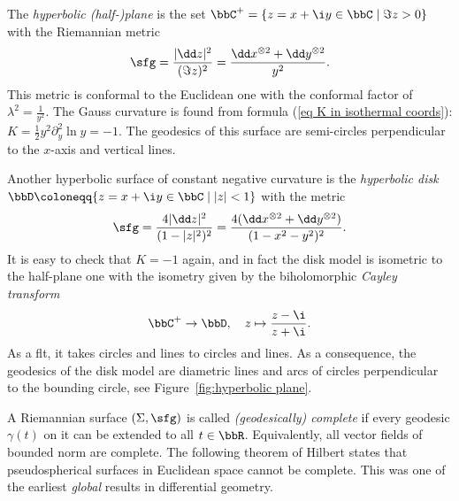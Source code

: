 \begin{example}
    The \emph{hyperbolic (half-)plane} is the set $\bbC^+=\{z=x+\i y\in\bbC\mid \Im z>0\}$ with the Riemannian metric 
    \[\sfg=\frac{|\dd z|^2}{(\Im z)^2}=\frac{\dd x^{\otimes 2}+\dd y^{\otimes 2}}{y^2}.\]
    This metric is conformal to the Euclidean one with the conformal factor of $\lambda^2=\frac{1}{y^2}$. The Gauss curvature is found from formula (\ref{eq K in isothermal coords}): $K=\frac12y^2\partial_y^2\ln y=-1$. The geodesics of this surface are semi-circles perpendicular to the $x$-axis and vertical lines.
    
    Another hyperbolic surface of constant negative curvature is the \emph{hyperbolic disk}  $\bbD\coloneqq \{z=x+\i y\in\bbC \mid |z|<1\}$ with the metric 
    \[\sfg=\frac{4|\dd z|^2}{(1-|z|^2)^2}=\frac{4(\dd x^{\otimes 2}+\dd y^{\otimes 2})}{(1-x^2-y^2)^2}.\]
    It is easy to check that $K=-1$ again, and in fact the disk model is isometric to the half-plane one with the isometry given by the biholomorphic \emph{Cayley transform} 
    \[\bbC^+\to \bbD,\quad z\mapsto \frac{z-\i }{z+\i}.\]
    As a \gls{flt}, it takes circles and lines to circles and lines. As a consequence, the geodesics of the disk model are diametric lines and arcs of circles perpendicular to the bounding circle, see Figure~\ref{fig:hyperbolic plane}.
\end{example}


A Riemannian surface $(\Sigma,\sfg)$ is called \emph{(geodesically) complete} if every geodesic $\gamma(t)$ on it can be extended to all $t\in\bbR$. Equivalently, all vector fields of bounded norm are complete. The following theorem of Hilbert states that pseudospherical surfaces in Euclidean space cannot be complete. This was one of the earliest \emph{global} results in differential geometry. 

